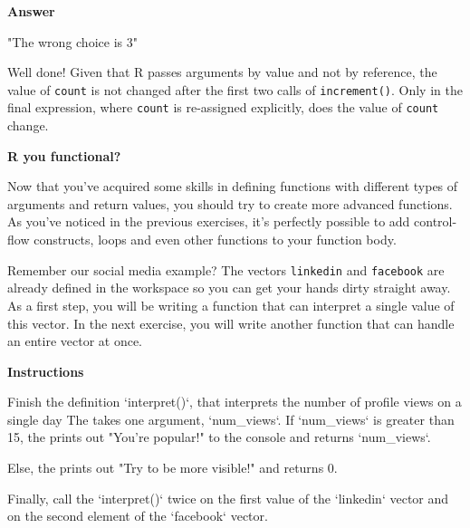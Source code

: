 \documentclass[]{article}
\newcommand{\hlnum}[1]{\textcolor[rgb]{0.816,0.125,0.439}{#1}}%
\newcommand{\hlstr}[1]{\textcolor[rgb]{0.251,0.627,0.251}{#1}}%
\newcommand{\hlstd}[1]{\textcolor[rgb]{0.251,0.251,0.251}{#1}}%
\newcommand{\hlkwc}[1]{\textcolor[rgb]{0.251,0.251,0.251}{#1}}%
\newenvironment{Shaded}{\begin{myshaded}}{\end{myshaded}}
\renewenvironment{verbatim}{\color{codecolor}\begin{myshaded}\begin{oldverbatim}}{\end{oldverbatim}\end{myshaded}}
\newcommand{\DataTypeTok}[1]{\hlkwc{#1}}
\newcommand{\DecValTok}[1]{\hlnum{#1}}
\newcommand{\StringTok}[1]{\hlstr{#1}}
\newcommand{\NormalTok}[1]{\hlstd{#1}}
\begin{document}
\textbf{Answer}

\begin{verbatim}
   [1] "The wrong choice is 3"
\end{verbatim}

Well done! Given that R passes arguments by value and not by reference,
the value of \texttt{count} is not changed after the first two calls of
\texttt{increment()}. Only in the final expression, where \texttt{count}
is re-assigned explicitly, does the value of \texttt{count} change.

\textbf{R you functional?}

Now that you've acquired some skills in defining functions with
different types of arguments and return values, you should try to create
more advanced functions. As you've noticed in the previous exercises,
it's perfectly possible to add control-flow constructs, loops and even
other functions to your function body.

Remember our social media example? The vectors \texttt{linkedin} and
\texttt{facebook} are already defined in the workspace so you can get
your hands dirty straight away. As a first step, you will be writing a
function that can interpret a single value of this vector. In the next
exercise, you will write another function that can handle an entire
vector at once.

\textbf{Instructions}

\begin{Shaded}
\begin{Highlighting}[]
\OperatorTok{*}\StringTok{ }\NormalTok{Finish the }\NormalTok{ definition } \StringTok{`}\DataTypeTok{interpret()}\StringTok{`}\NormalTok{, that interprets the number of profile views on a single day}\OperatorTok{:}
\OperatorTok{+}\StringTok{ }\NormalTok{The }\NormalTok{ takes one argument, }\StringTok{`}\DataTypeTok{num_views}\StringTok{`}\NormalTok{.}
\OperatorTok{+}\StringTok{ }\NormalTok{If }\StringTok{`}\DataTypeTok{num_views}\StringTok{`}\NormalTok{ is greater than }\DecValTok{15}\NormalTok{, the }\NormalTok{ prints out }\StringTok{"You're popular!"}\NormalTok{ to the console and returns }\StringTok{`}\DataTypeTok{num_views}\StringTok{`}\NormalTok{.}

\OperatorTok{+}\StringTok{ }\NormalTok{Else, the }\NormalTok{ prints out }\StringTok{"Try to be more visible!"}\NormalTok{ and returns }\DecValTok{0}\NormalTok{.}

\OperatorTok{*}\StringTok{ }\NormalTok{Finally, call the }\StringTok{`}\DataTypeTok{interpret()}\StringTok{`} \NormalTok{ twice}\OperatorTok{:}\StringTok{ }\NormalTok{on the first value of the }\StringTok{`}\DataTypeTok{linkedin}\StringTok{`}\NormalTok{ vector and on the second element of the }\StringTok{`}\DataTypeTok{facebook}\StringTok{`}\NormalTok{ vector.}
\end{Highlighting}
\end{Shaded}
\end{document}
